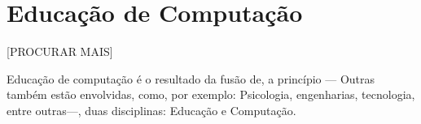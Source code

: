 \documentclass[
	12pt,				%
	openright,			%
	oneside,
	a4paper,			%
	english,			%
	french,				%
	spanish,			%
	brazil,				%
	]{abntex2}
\begin{document}

\section{Educação de Computação}
\label{sec:EC}

{\color{red} [PROCURAR MAIS]} 

Educação de computação é o resultado da fusão de, a princípio — Outras também estão envolvidas, como, por exemplo: Psicologia, engenharias, tecnologia, entre outras—, duas disciplinas: Educação e Computação. 
\end{document}
